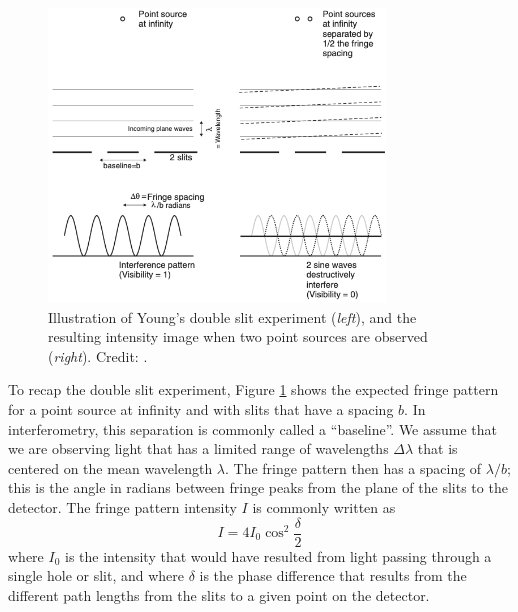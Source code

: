 \documentclass[11pt]{article}
\begin{document}
\begin{figure}[h]
    \centering
    \includegraphics[width=0.8\textwidth]{doc/youngs.png}
    \caption{Illustration of Young's double slit experiment (\emph{left}), and the resulting intensity image when two point sources are observed (\emph{right}). Credit: \citet{2003RPPh...66..789M}.}
    \label{fig:youngs}
\end{figure}

To recap the double slit experiment, Figure \ref{fig:youngs} shows the expected fringe pattern for a point source at infinity and with slits that have a spacing $b$. In interferometry, this separation is commonly called a ``baseline''. We assume that we are observing light that has a limited range of wavelengths $\Delta \lambda$ that is centered on the mean wavelength $\lambda$. The fringe pattern then has a spacing of $\lambda/b$; this is the angle in radians between fringe peaks from the plane of the slits to the detector. The fringe pattern intensity $I$ is commonly written as
\begin{equation}\label{eq:fringepattern}
    I = 4 I_0 \cos^2 \frac{\delta}{2}
\end{equation}
where $I_0$ is the intensity that would have resulted from light passing through a single hole or slit, and where $\delta$ is the phase difference that results from the different path lengths from the slits to a given point on the detector.
\end{document}
